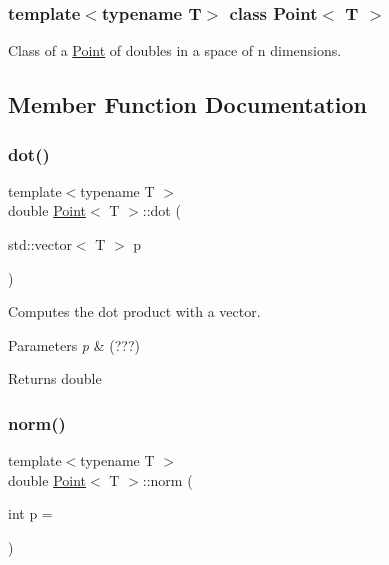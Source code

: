 \subsubsection*{template$<$typename T$>$\newline
class Point$<$ T $>$}

Class of a \hyperlink{class_point}{Point} of doubles in a space of n dimensions. 

\subsection{Member Function Documentation}
\mbox{\label{class_point_ab1a74677723b3774be565d88af2187f8}} 
\subsubsection{\texorpdfstring{dot()}{dot()}}
{\footnotesize\ttfamily template$<$typename T $>$ \\
double \hyperlink{class_point}{Point}$<$ T $>$\+::dot (\begin{DoxyParamCaption}\item[{std\+::vector$<$ T $>$}]{p }\end{DoxyParamCaption})}



Computes the dot product with a vector. 


\begin{DoxyParams}{Parameters}
{\em p} & (???) \\
\hline
\end{DoxyParams}
\begin{DoxyReturn}{Returns}
double 
\end{DoxyReturn}
\mbox{\label{class_point_a399e38f00c2bb383ba6291b2318e7207}} 
\subsubsection{\texorpdfstring{norm()}{norm()}}
{\footnotesize\ttfamily template$<$typename T $>$ \\
double \hyperlink{class_point}{Point}$<$ T $>$\+::norm (\begin{DoxyParamCaption}\item[{int}]{p = {} }\end{DoxyParamCaption})}



